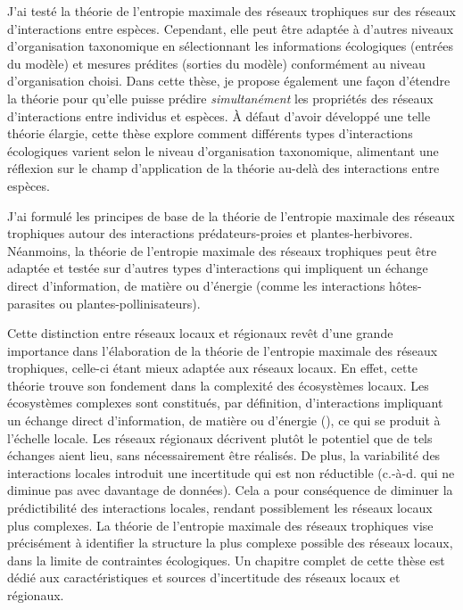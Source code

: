 J'ai testé la théorie de l'entropie maximale des réseaux trophiques sur des
réseaux d'interactions entre espèces. Cependant, elle peut être adaptée à
d'autres niveaux d'organisation taxonomique en sélectionnant les informations
écologiques (entrées du modèle) et mesures prédites (sorties du modèle)
conformément au niveau d'organisation choisi. Dans cette thèse, je propose
également une façon d'étendre la théorie pour qu'elle puisse prédire
\textit{simultanément} les propriétés des réseaux d'interactions entre individus
et espèces. À défaut d'avoir développé une telle théorie élargie, cette thèse
explore comment différents types d'interactions écologiques varient selon le
niveau d'organisation taxonomique, alimentant une réflexion sur le champ
d'application de la théorie au-delà des interactions entre espèces. 

J'ai formulé les principes de base de la théorie de l'entropie maximale des
réseaux trophiques autour des interactions prédateurs-proies et
plantes-herbivores. Néanmoins, la théorie de l'entropie maximale des réseaux
trophiques peut être adaptée et testée sur d'autres types d'interactions qui
impliquent un échange direct d'information, de matière ou d'énergie (comme les
interactions hôtes-parasites ou plantes-pollinisateurs).

Cette distinction entre réseaux locaux et régionaux revêt d'une grande
importance dans l'élaboration de la théorie de l'entropie maximale des réseaux
trophiques, celle-ci étant mieux adaptée aux réseaux locaux. En effet, cette
théorie trouve son fondement dans la complexité des écosystèmes locaux. Les
écosystèmes complexes sont constitués, par définition, d'interactions impliquant
un échange direct d'information, de matière ou d'énergie
(\cite{Ladyman2013What}), ce qui se produit à l'échelle locale. Les réseaux
régionaux décrivent plutôt le potentiel que de tels échanges aient lieu, sans
nécessairement être réalisés. De plus, la variabilité des interactions locales
introduit une incertitude qui est non réductible (c.-à-d. qui ne diminue pas
avec davantage de données). Cela a pour conséquence de diminuer la prédictibilité des
interactions locales, rendant possiblement les réseaux locaux plus complexes. La
théorie de l'entropie maximale des réseaux trophiques vise précisément à
identifier la structure la plus complexe possible des réseaux locaux, dans la
limite de contraintes écologiques. Un chapitre complet de cette thèse est dédié
aux caractéristiques et sources d'incertitude des réseaux locaux et régionaux.


